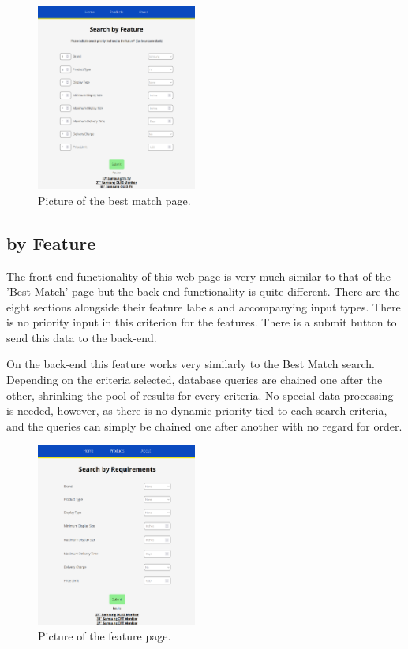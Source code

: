 \documentclass[sigconf]{acmart}
\begin{document}
\begin{figure}[H] %
	\centering %
	\includegraphics[width=0.47\textwidth]{Figures/bestmatch.png} %
	\caption{Picture of the best match page.}
\end{figure}

\pagebreak
\subsection{by Feature}\label{feature}
The front-end functionality of this web page is very much similar to that of the 'Best Match' page but the back-end functionality is quite different. There are the eight sections alongside their feature labels and accompanying input types. There is no priority input in this criterion for the features. There is a submit button to send this data to the back-end. \par
On the back-end this feature works very similarly to the Best Match search. Depending on the criteria selected, database queries are chained one after the other, shrinking the pool of results for every criteria. No special data processing is needed, however, as there is no dynamic priority tied to each search criteria, and the queries can simply be chained one after another with no regard for order.

\begin{figure}[H] %
	\centering %
	\includegraphics[width=0.47\textwidth]{Figures/requirements.png} %
	\caption{Picture of the feature page.}
\end{figure}
\end{document}

